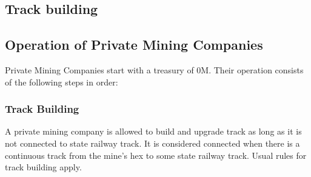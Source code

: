 \documentclass[a4paper,twocolumn]{article}
\begin{document}
\subsection{Track building}


\subsection{Operation of Private Mining Companies}
Private Mining Companies start with a treasury of 0M. Their operation consists
of the following steps in order:

\subsubsection{Track Building}
A private mining company is allowed to build and upgrade track as long as it is
not connected to state railway track. It is considered connected when there is
a continuous track from the mine's hex to some state railway track. Usual rules
for track building apply.
\end{document}
